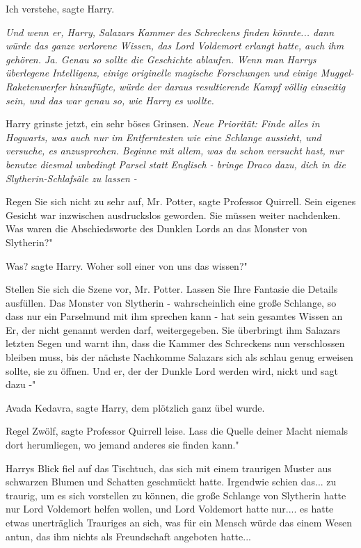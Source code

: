 \glqq Ich verstehe\grqq{}, sagte Harry.

\emph{ Und wenn er, Harry, Salazars Kammer des Schreckens finden könnte... dann
würde das ganze verlorene Wissen, das Lord Voldemort erlangt hatte, auch ihm
gehören. Ja. Genau so sollte die Geschichte ablaufen. Wenn man Harrys überlegene
Intelligenz, einige originelle magische Forschungen und einige
Muggel-Raketenwerfer hinzufügte, würde der daraus resultierende Kampf völlig
einseitig sein, und das war genau so, wie Harry es wollte.}

Harry grinste jetzt, ein sehr böses Grinsen.
\emph{Neue Priorität: Finde alles in Hogwarts, was auch nur im Entferntesten wie eine Schlange aussieht, und versuche, es anzusprechen. Beginne mit allem, was du schon versucht hast, nur benutze diesmal unbedingt Parsel statt Englisch - bringe Draco dazu, dich in die Slytherin-Schlafsäle zu lassen -}

\glqq Regen Sie sich nicht zu sehr auf, Mr. Potter\grqq{}, sagte Professor
Quirrell. Sein eigenes Gesicht war inzwischen ausdruckslos geworden. \glqq Sie
müssen weiter nachdenken. Was waren die Abschiedsworte des Dunklen Lords an das
Monster von Slytherin?"

\glqq Was?\grqq{} sagte Harry. \glqq Woher soll einer von uns das wissen?"

\glqq Stellen Sie sich die Szene vor, Mr. Potter. Lassen Sie Ihre Fantasie die
Details ausfüllen. Das Monster von Slytherin - wahrscheinlich eine große
Schlange, so dass nur ein Parselmund mit ihm sprechen kann - hat sein gesamtes
Wissen an Er, der nicht genannt werden darf, weitergegeben. Sie überbringt ihm
Salazars letzten Segen und warnt ihn, dass die Kammer des Schreckens nun
verschlossen bleiben muss, bis der nächste Nachkomme Salazars sich als schlau
genug erweisen sollte, sie zu öffnen. Und er, der der Dunkle Lord werden wird,
nickt und sagt dazu -"

\glqq Avada Kedavra\grqq{}, sagte Harry, dem plötzlich ganz übel wurde.

\glqq Regel Zwölf\grqq{}, sagte Professor Quirrell leise. \glqq Lass die Quelle
deiner Macht niemals dort herumliegen, wo jemand anderes sie finden kann."

Harrys Blick fiel auf das Tischtuch, das sich mit einem traurigen Muster aus
schwarzen Blumen und Schatten geschmückt hatte. Irgendwie schien das... zu
traurig, um es sich vorstellen zu können, die große Schlange von Slytherin hatte
nur Lord Voldemort helfen wollen, und Lord Voldemort hatte nur.... es hatte
etwas unerträglich Trauriges an sich, was für ein Mensch würde das einem Wesen
antun, das ihm nichts als Freundschaft angeboten hatte...

